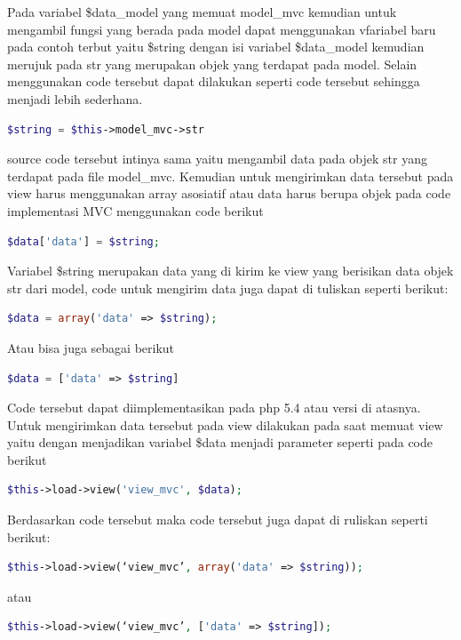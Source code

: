 Pada variabel \$data\_model yang memuat model\_mvc kemudian untuk mengambil fungsi yang berada pada model dapat menggunakan vfariabel baru pada contoh terbut yaitu \$string dengan isi variabel \$data\_model kemudian merujuk pada str yang merupakan objek yang terdapat pada model. Selain menggunakan code tersebut dapat dilakukan seperti code tersebut sehingga menjadi lebih sederhana.

\begin{lstlisting}[language=PHP]
$string = $this->model_mvc->str
\end{lstlisting}
source code tersebut intinya sama yaitu mengambil data pada objek str yang terdapat pada file model\_mvc. Kemudian untuk mengirimkan data tersebut pada view harus menggunakan array asosiatif atau data harus berupa objek pada code implementasi MVC menggunakan code berikut 

\begin{lstlisting}[language=PHP]
$data['data'] = $string;
\end{lstlisting}

Variabel \$string merupakan data yang di kirim ke view yang berisikan data objek str dari model, code untuk mengirim data juga dapat di tuliskan seperti berikut: 

\begin{lstlisting}[language=PHP]
$data = array('data' => $string);
\end{lstlisting}

Atau bisa juga sebagai berikut

\begin{lstlisting}[language=PHP]
$data = ['data' => $string]
\end{lstlisting}

Code tersebut dapat diimplementasikan pada php 5.4 atau versi di atasnya.
Untuk mengirimkan data tersebut pada view dilakukan pada saat memuat view yaitu dengan menjadikan variabel \$data menjadi parameter seperti pada code berikut

\begin{lstlisting}[language=PHP]
$this->load->view('view_mvc', $data);
\end{lstlisting}

Berdasarkan code tersebut maka code tersebut juga dapat di ruliskan seperti berikut:

\begin{lstlisting}[language=PHP]
$this->load->view(‘view_mvc’, array('data' => $string));
\end{lstlisting}
atau
\begin{lstlisting}[language=PHP]
$this->load->view(‘view_mvc’, ['data' => $string]);
\end{lstlisting}

